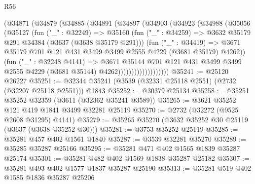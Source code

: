 \begin{lexlean}{R56}
\begin{coremodule}
                    (@34871
                      (@34879
                        (@34885
                          (@34891
                            (@34897
                              (@34903
                                (@34923
                                  (@34988
                                    (@35056
                                      (@35127
                                        (fun ("_" : @32249) =>
                                        @35160
                                          (fun ("_" : @34259) =>
                                          @3632 @35179 @291 @34384 (@3637 (@3638 @35179 @291)))
                                          (fun ("_" : @34419) =>
                                          @3671
                                            @35179
                                            @701
                                            @121
                                            @431
                                            @3499
                                            @3499
                                            @2555
                                            @4229
                                            (@3681 @35179)
                                            @4262))
                                        (fun ("_" : @32248 @4141) =>
                                        @3671
                                          @35144
                                          @701
                                          @121
                                          @431
                                          @3499
                                          @3499
                                          @2555
                                          @4229
                                          (@3681 @35144)
                                          @4262)))))))))))))))))))
@35241 := @25120 @26227
@35251 := @32344 @35241 (@3539 (@32331 @25118 @2551) (@2732 (@32207 @25118 @2551))) @1843
@35252 := @30379 @25134
@35258 := @35251 @35252 @32359 (@3611 (@32362 @35241 @3589))
@35265 := @3621 @35252 @121 @419 @1841 @3499 @32281 @25119
@35270 := @2732 (@32272 (@9525 @2608 @31295) @4141)
@35279 := @35265 @35270 (@3632 @35252 @30 @25119 (@3637 (@3638 @35252 @30)))
@35281 := @3753 @35252 @25119
@35285 := @35281 @457 @402 @1561 @1840
@35287 := @3539 @32281 @35270
@35289 := @35285 @35287 @25166
@35295 := @35281 @471 @402 @1565 @1839 @35287 @25174
@35301 := @35281 @482 @402 @1569 @1838 @35287 @25182
@35307 := @35281 @493 @402 @1577 @1837 @35287 @25190
@35313 := @35281 @519 @402 @1585 @1836 @35287 @25206

\end{coremodule}
\end{lexlean}
